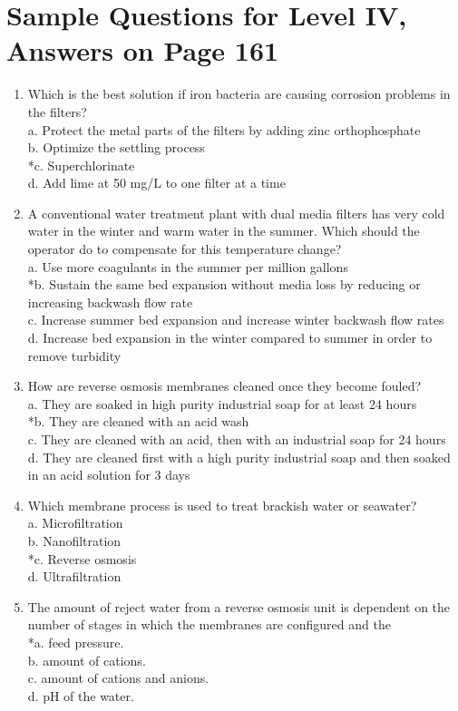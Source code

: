 \section{Sample Questions for Level IV, Answers on Page 161}
\begin{enumerate}[label=TIV-\arabic*]
  \item Which is the best solution if iron bacteria are causing corrosion problems in the filters?\\
a. Protect the metal parts of the filters by adding zinc orthophosphate\\
b. Optimize the settling process\\
*c. Superchlorinate\\
d. Add lime at 50 mg/L to one filter at a time\\
  \item A conventional water treatment plant with dual media filters has very cold water in the winter and warm water in the summer. Which should the operator do to compensate for this temperature change?\\
a. Use more coagulants in the summer per million gallons\\
*b. Sustain the same bed expansion without media loss by reducing or increasing backwash flow rate\\
c. Increase summer bed expansion and increase winter backwash flow rates\\
d. Increase bed expansion in the winter compared to summer in order to remove turbidity\\
  \item How are reverse osmosis membranes cleaned once they become fouled?\\
a. They are soaked in high purity industrial soap for at least 24 hours\\
*b. They are cleaned with an acid wash\\
c. They are cleaned with an acid, then with an industrial soap for 24 hours\\
d. They are cleaned first with a high purity industrial soap and then soaked in an acid solution for 3 days\\
  \item Which membrane process is used to treat brackish water or seawater?\\
a. Microfiltration\\
b. Nanofiltration\\
*c. Reverse osmosis\\
d. Ultrafiltration\\
  \item The amount of reject water from a reverse osmosis unit is dependent on the number of stages in which the membranes are configured and the\\
*a. feed pressure.\\
b. amount of cations.\\
c. amount of cations and anions.\\
d. pH of the water.\\
\end{enumerate}
